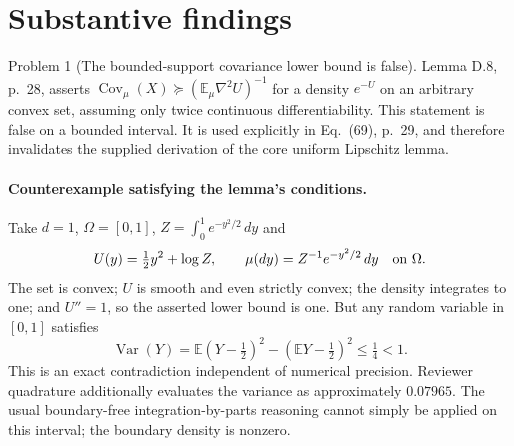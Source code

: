 \documentclass[10pt]{article}
\begin{document}
\section*{Substantive findings}
Problem 1 (The bounded-support covariance lower bound is false).  Lemma D.8, p. 28, asserts \(\operatorname{Cov}_{\mu}(X)\succeq(\mathbb E_\mu\nabla^2U)^{-1}\) for a density \(e^{-U}\) on an arbitrary convex set, assuming only twice continuous differentiability. This statement is false on a bounded interval. It is used explicitly in Eq. (69), p. 29, and therefore invalidates the supplied derivation of the core uniform Lipschitz lemma.\par
\paragraph*{Counterexample satisfying the lemma’s conditions.}\mbox{}\par
Take \(d=1\), \(\Omega=[0,1]\), \(Z=\int_0^1e^{-y^2/2}\,dy\) and \[U(y)=\tfrac12y^2+\log Z,\qquad \mu(dy)=Z^{-1}e^{-y^2/2}\,dy\quad\hbox{on }\Omega.\] The set is convex; \(U\) is smooth and even strictly convex; the density integrates to one; and \(U''=1\), so the asserted lower bound is one. But any random variable in \([0,1]\) satisfies \[\operatorname{Var}(Y)=\mathbb E(Y-\tfrac12)^2-(\mathbb EY-\tfrac12)^2\leq\tfrac14<1.\] This is an exact contradiction independent of numerical precision. Reviewer quadrature additionally evaluates the variance as approximately \(0.07965\). The usual boundary-free integration-by-parts reasoning cannot simply be applied on this interval; the boundary density is nonzero.\par
\end{document}
